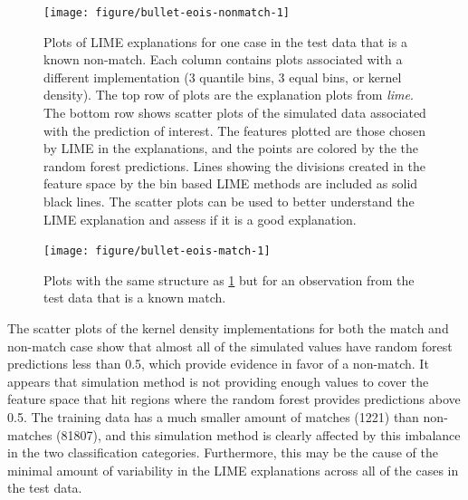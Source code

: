 \documentclass[AMS,STIX2COL]{WileyNJD-v2}\usepackage[]{graphicx}\usepackage[]{color}
\newenvironment{knitrout}{}{} %
\begin{document}
{\begin{figure}[!htbp]
\begin{knitrout}
\color{fgcolor}
\texttt{[image: figure/bullet-eois-nonmatch-1]} 

\end{knitrout}
\caption{Plots of LIME explanations for one case in the test data that is a known non-match. Each column contains plots associated with a different implementation (3 quantile bins, 3 equal bins, or kernel density). The top row of plots are the explanation plots from \emph{lime}. The bottom row shows scatter plots of the simulated data associated with the prediction of interest. The features plotted are those chosen by LIME in the explanations, and the points are colored by the the random forest predictions. Lines showing the divisions created in the feature space by the bin based LIME methods are included as solid black lines. The scatter plots can be used to better understand the LIME explanation and assess if it is a good explanation.}
\label{fig:bullet-eois-nonmatch}

\vspace*{\floatsep}

\begin{knitrout}
\color{fgcolor}
\texttt{[image: figure/bullet-eois-match-1]} 

\end{knitrout}
\caption{Plots with the same structure as \ref{fig:bullet-eois-match} but for an observation from the test data that is a known match.}
\label{fig:bullet-eois-match}
\end{figure}

The scatter plots of the kernel density implementations for both the match and non-match case show that almost all of the simulated values have random forest predictions less than 0.5, which provide evidence in favor of a non-match. It appears that simulation method is not providing enough values to cover the feature space that hit regions where the random forest provides predictions above 0.5. The training data has a much smaller amount of matches (1221) than non-matches (81807), and this simulation method is clearly affected by this imbalance in the two classification categories. Furthermore, this may be the cause of the minimal amount of variability in the LIME explanations across all of the cases in the test data.

}
\end{document}
